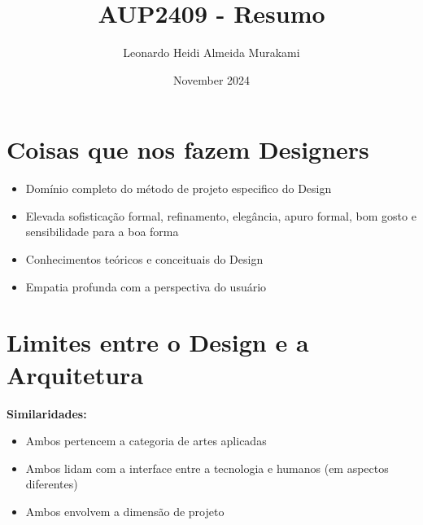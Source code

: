 \documentclass{article}
\title{AUP2409 - Resumo}
\author{Leonardo  Heidi Almeida Murakami}
\date{November 2024}
\begin{document}
\maketitle
\newpage

\tableofcontents
\newpage

\section{Coisas que nos fazem Designers}

\begin{itemize}
    \item Domínio completo do método de projeto especifico do Design
    \item Elevada sofisticação formal, refinamento, elegância, apuro formal, bom gosto e sensibilidade para a boa forma
    \item Conhecimentos teóricos e conceituais do Design
    \item Empatia profunda com a perspectiva do usuário
\end{itemize}

\newpage
\section{Limites entre o Design e a Arquitetura}

\textbf{Similaridades:}
\begin{itemize}
    \item Ambos pertencem a categoria de artes aplicadas
    \item Ambos lidam com a interface entre a tecnologia e humanos (em aspectos diferentes)
    \item Ambos envolvem a dimensão de projeto
\end{itemize}
\end{document}
